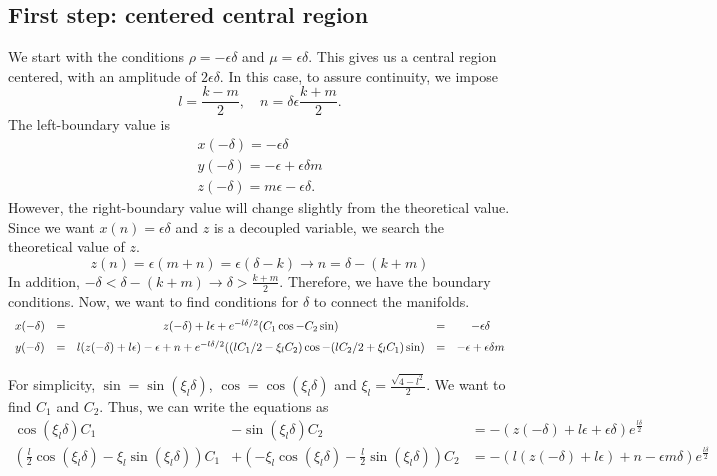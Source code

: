 \documentclass[a4paper,preprint,11pt]{article}
\begin{document}
\subsection{First step: centered central region}
We start with the conditions $\rho=-\epsilon\delta$ and $\mu = \epsilon\delta$. This gives us a central region centered, with an amplitude of $2\epsilon\delta$. In this case, to assure continuity, we impose 
$$
l = \frac{k-m}{2}, \quad n = \delta\epsilon\frac{k+m}{2}.
$$
The left-boundary value is
$$
\begin{array}{l}
x(-\delta) = -\epsilon\delta \\
y(-\delta) = -\epsilon+\epsilon\delta m \\
z(-\delta) = m\epsilon-\epsilon\delta .
\end{array}
$$
However, the right-boundary value will change slightly from the theoretical value. Since we want $x( n)=\epsilon\delta$ and $z$ is a decoupled variable, we search the theoretical value of $z$.
$$
z( n)=\epsilon(m+ n) = \epsilon(\delta-k) \rightarrow \boxed{ n = \delta-(k+m)}
$$
In addition, $-\delta<\delta-(k+m)\rightarrow\delta>\frac{k+m}{2}$. Therefore, we have the boundary conditions. Now, we want to find conditions for $\delta$ to connect the manifolds.
$$
\begin{array}{ccccc}
x(-\delta) & = & z(-\delta)+l\epsilon+e^{-l\delta/2}(C_1\cos-C_2\sin) & = & -\epsilon\delta \vspace{0.2cm}\\
y(-\delta) & = & l(z(-\delta)+l\epsilon)-\epsilon+n+ e^{-l\delta/2}((lC_1/2-\xi_lC_2)\cos-(lC_2/2+\xi_lC_1)\sin) & = & -\epsilon+\epsilon\delta m \vspace{0.3cm} \\ %
\end{array}
$$
For simplicity, $\sin=\sin(\xi_l\delta)$, $\cos=\cos(\xi_l\delta)$ and $\xi_l=\frac{\sqrt{4-l^2}}{2}$. We want to find $C_1$ and $C_2$. Thus, we can write the equations as
$$
\begin{array}{rrl}
\cos(\xi_l\delta)C_1 & -\sin(\xi_l\delta)C_2 & = -(z(-\delta)+l\epsilon+\epsilon\delta)e^{\frac{l\delta}{2}} \\
\left(\frac{l}{2}\cos(\xi_l\delta)-\xi_l\sin(\xi_l\delta) \right)C_1 & +\left(-\xi_l\cos(\xi_l\delta)-\frac{l}{2}\sin(\xi_l\delta)\right)C_2 & = -(l(z(-\delta)+l\epsilon)+n-\epsilon m\delta)e^{\frac{l\delta}{2}} \\
\end{array}
$$
\end{document}
